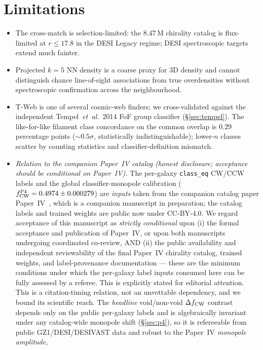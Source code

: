 \documentclass[aps,prd,twocolumn,superscriptaddress,showpacs,preprintnumbers,nofootinbib,longbibliography,floatfix]{revtex4-2}
\newcommand{\paperIVarxiv}{companion manuscript in preparation}
\begin{document}
\section{Limitations}\label{sec:limitations}

\begin{itemize}
\item The cross-match is selection-limited: the $8.47$\,M chirality
catalog is flux-limited at $r\!\le\!17.8$ in the DESI Legacy regime;
DESI spectroscopic targets extend much fainter.
\item Projected $k\!=\!5$ NN density is a coarse proxy for 3D density
and cannot distinguish chance line-of-sight associations from true
overdensities without spectroscopic confirmation across the
neighbourhood.
\item T-Web is one of several cosmic-web finders; we cross-validated
against the independent Tempel~\textit{et~al.}~2014 \cite{Tempel2014}
FoF group classifier (\S\ref{sec:tempel}). The like-for-like filament
class
concordance on the common overlap is $0.29$\,percentage points
(${\sim}0.5\sigma$, statistically indistinguishable); lower-$n$
classes scatter by counting statistics and
classifier-definition mismatch.
\item \emph{Relation to the companion Paper~IV catalog
(honest disclosure; acceptance should be conditional on Paper~IV).}
The per-galaxy \texttt{class\_eq} CW/CCW labels and
the global classifier-monopole calibration ($f_{\rm CW}^{\rm P4} =
0.4974 \pm 0.000279$) are \emph{inputs} taken from the companion catalog
paper Paper~IV~\cite{golden_chirality_2026}, which is a
\paperIVarxiv; the catalog labels and trained weights are public now under
CC-BY-4.0. We regard acceptance of this manuscript as \emph{strictly
conditional} upon (i) the formal acceptance and publication of Paper~IV,
or upon both manuscripts undergoing coordinated co-review, AND (ii) the
public availability and independent reviewability of the final Paper~IV
chirality catalog, trained weights, and label-provenance documentation ---
these are the minimum conditions under which the per-galaxy label
inputs consumed here can be fully assessed by a referee. This is
explicitly stated for editorial attention. This is a citation-timing relation, not an
unvettable dependency, and we bound its scientific reach. The \emph{headline}
void/non-void $\Delta f_{\rm CW}$ contrast depends only on the public
per-galaxy labels and is algebraically invariant under any catalog-wide
monopole shift (\S\ref{sec:p4}), so it is refereeable from public
GZ1/DESI/DESIVAST data and robust to the Paper~IV \emph{monopole amplitude,
}
\end{itemize}
\end{document}
